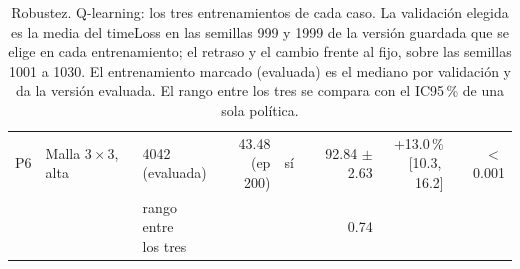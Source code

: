\begin{table}[H]
\begin{tabular}{lllrlrrr}
P6 & \makecell[l]{Malla $3 \times 3$,\\{}alta} & \makecell[l]{4042\\{}(evaluada)} & \makecell[r]{43.48\\{}(ep 200)} & sí & \makecell[r]{92.84\\{}$\pm$ 2.63} & \makecell[r]{+13.0\,\%\\{}[10.3,\,16.2]} & $<$\,0.001 \\
 & & \makecell[l]{rango entre\\{}los tres} & & & 0.74 & & \\
\bottomrule
\end{tabular}
\caption[Robustez: entrenamientos de Q-learning]{Robustez. Q-learning: los tres entrenamientos de cada caso. La validación elegida es la media del timeLoss en las semillas 999 y 1999 de la versión guardada que se elige en cada entrenamiento; el retraso y el cambio frente al fijo, sobre las semillas 1001 a 1030. El entrenamiento marcado (evaluada) es el mediano por validación y da la versión evaluada. El rango entre los tres se compara con el IC95\,\% de una sola política.}
\label{tab:robustez-veredicto-bases-ql}
\end{table}

